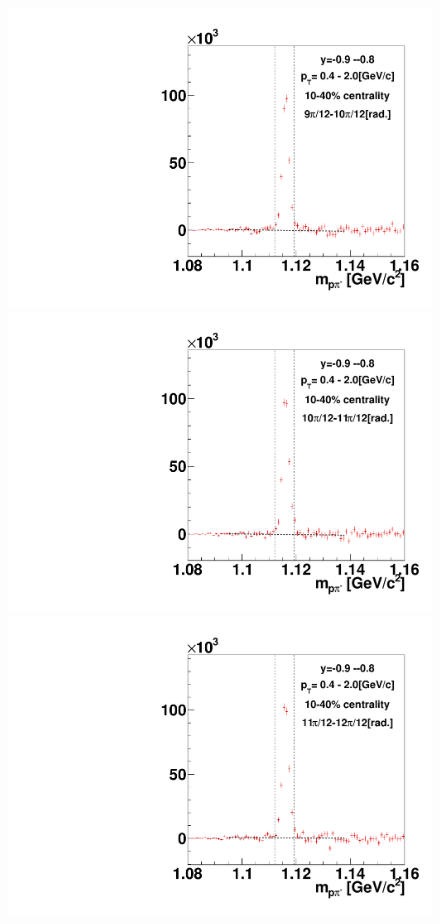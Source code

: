 \begin{figure}[h]
\includegraphics[width=0.14\linewidth]{chapterX/fig/ld_v1_sig/kf_ptslice0_cent1_ld_flow_phi10_rap13.pdf}
\includegraphics[width=0.14\linewidth]{chapterX/fig/ld_v1_sig/kf_ptslice0_cent1_ld_flow_phi11_rap13.pdf}
\includegraphics[width=0.14\linewidth]{chapterX/fig/ld_v1_sig/kf_ptslice0_cent1_ld_flow_phi12_rap13.pdf}


\end{figure}
